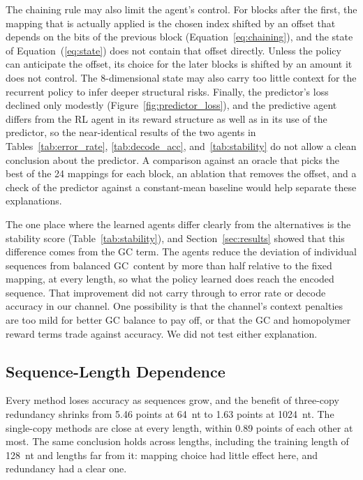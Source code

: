 \documentclass[entropy,article,submit,moreauthors]{Definitions/mdpi}
\begin{document}
The chaining rule may also limit the agent's control. For blocks after the first, the mapping that is actually applied is the chosen index shifted by an offset that depends on the bits of the previous block (Equation~\ref{eq:chaining}), and the state of Equation~(\ref{eq:state}) does not contain that offset directly. Unless the policy can anticipate the offset, its choice for the later blocks is shifted by an amount it does not control. The 8-dimensional state may also carry too little context for the recurrent policy to infer deeper structural risks. Finally, the predictor's loss declined only modestly (Figure~\ref{fig:predictor_loss}), and the predictive agent differs from the RL agent in its reward structure as well as in its use of the predictor, so the near-identical results of the two agents in Tables~\ref{tab:error_rate}, \ref{tab:decode_acc}, and~\ref{tab:stability} do not allow a clean conclusion about the predictor. A comparison against an oracle that picks the best of the 24 mappings for each block, an ablation that removes the offset, and a check of the predictor against a constant-mean baseline would help separate these explanations.

The one place where the learned agents differ clearly from the alternatives is the stability score (Table~\ref{tab:stability}), and Section~\ref{sec:results} showed that this difference comes from the GC term. The agents reduce the deviation of individual sequences from balanced GC~content by more than half relative to the fixed mapping, at every length, so what the policy learned does reach the encoded sequence. That improvement did not carry through to error rate or decode accuracy in our channel. One possibility is that the channel's context penalties are too mild for better GC balance to pay off, or that the GC and homopolymer reward terms trade against accuracy. We did not test either explanation.

\subsection{Sequence-Length Dependence}

Every method loses accuracy as sequences grow, and the benefit of three-copy redundancy shrinks from 5.46 points at 64~nt to 1.63 points at 1024~nt. The single-copy methods are close at every length, within 0.89 points of each other at most. The same conclusion holds across lengths, including the training length of 128~nt and lengths far from it: mapping choice had little effect here, and redundancy had a clear one.
\end{document}
